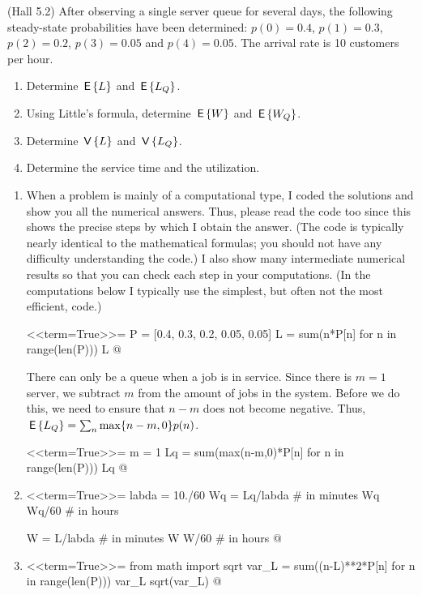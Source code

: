 \begin{exercise}(Hall 5.2) \label{exer: Hall} After observing a single server queue for
  several days, the following steady-state probabilities have been
  determined: $p(0)=0.4$, $p(1) = 0.3$, $p(2)=0.2$, $p(3)=0.05$ and
  $p(4)=0.05$. The arrival rate is 10 customers per hour. 
  \begin{enumerate}
  \item Determine $\,\mathsf{E}\left\{L\right\}$ and  $\,\mathsf{E}\left\{L_Q\right\}$. 
  \item Using Little's formula, determine $\,\mathsf{E}\left\{W\right\}$ and $\,\mathsf{E}\left\{W_Q\right\}$. 
\item Determine $\,\mathsf{V}\left\{L\right\}$ and $\,\mathsf{V}\left\{L_Q\right\}$.
  \item Determine the service time and the utilization.
  \end{enumerate}
    \begin{solution}
      \begin{enumerate}
      \item 
      When a problem is mainly of a computational type, I coded the
      solutions and show you all the numerical answers. Thus, please
      read the code too since this shows the precise steps by which I
      obtain the answer. (The code is typically nearly identical to
      the mathematical formulas; you should not have any difficulty
      understanding the code.) I also show many intermediate numerical
      results so that you can check each step in your computations. (In
      the computations below I typically use the simplest, but often
      not the most efficient, code.)

<<term=True>>=
P = [0.4, 0.3, 0.2, 0.05, 0.05]
L = sum(n*P[n] for n in range(len(P)))
L
@ 

There can only be a queue when a job is in service. Since there is
$m=1$ server, we subtract $m$ from the amount of jobs in the system.
Before we do this, we need to ensure that $n-m$ does not become
negative. Thus, $\,\mathsf{E}\left\{L_Q\right\} = \sum_n \max\{n-m, 0\} p(n)$.

<<term=True>>=
m = 1
Lq = sum(max(n-m,0)*P[n] for n in range(len(P)))
Lq
@

\item 

<<term=True>>=
labda = 10./60
Wq = Lq/labda # in minutes
Wq
Wq/60 # in hours

W = L/labda # in minutes
W
W/60 # in hours
@ 

\item 

<<term=True>>=
from math import sqrt
var_L = sum((n-L)**2*P[n] for n in range(len(P)))
var_L
sqrt(var_L)
@



\end{enumerate}
\end{solution}
\end{exercise}

